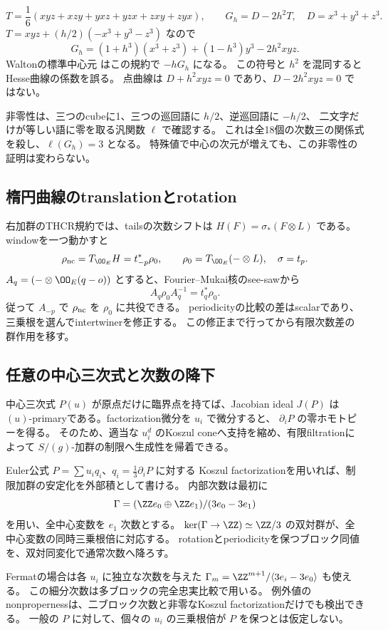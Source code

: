 \[
 T=\frac16(xyz+xzy+yxz+yzx+zxy+zyx),\qquad G_h=D-2h^2T,
 \quad D=x^3+y^3+z^3.
\]
\(T=xyz+(h/2)(-x^3+y^3-z^3)\) なので
\[
 G_h=(1+h^3)(x^3+z^3)+(1-h^3)y^3-2h^2xyz.
\]
Waltonの標準中心元 \cite[Equation (2.16)]{Walton} はこの規約で \(-hG_h\) になる。
この符号と \(h^2\) を混同するとHesse曲線の係数を誤る。
点曲線は \(D+h^2xyz=0\) であり、\(D-2h^2xyz=0\) ではない。

非零性は、三つのcubeに1、三つの巡回語に \(h/2\)、逆巡回語に \(-h/2\)、
二文字だけが等しい語に零を取る汎関数 \(\ell\) で確認する。
これは全18個の次数三の関係式を殺し、\(\ell(G_h)=3\) となる。
特殊値で中心の次元が増えても、この非零性の証明は変わらない。

\subsection{楕円曲線のtranslationとrotation}

右加群のTHCR規約では、tailsの次数シフトは
\(H(F)=\sigma_*(F\otimes L)\) である。
windowを一つ動かすと
\[
 \rho_{\rm nc}=T_{\OO_E}H=t_{-p}^*\rho_0,
 \qquad \rho_0=T_{\OO_E}(-\otimes L),\quad\sigma=t_p.
\]
\(A_q=(-\otimes\OO_E(q-o))\) とすると、Fourier--Mukai核のsee-sawから
\[
 A_q\rho_0A_q^{-1}=t_q^*\rho_0.
\]
従って \(A_{-p}\) で \(\rho_{\rm nc}\) を \(\rho_0\) に共役できる。
periodicityの比較の差はscalarであり、三乗根を選んでintertwinerを修正する。
この修正まで行ってから有限次数差の群作用を移す。

\subsection{任意の中心三次式と次数の降下}

中心三次式 \(P(u)\) が原点だけに臨界点を持てば、Jacobian ideal \(J(P)\) は
\((u)\)-primaryである。factorization微分を \(u_i\) で微分すると、
\(\partial_iP\) の零ホモトピーを得る。
そのため、適当な \(u_i^d\) のKoszul coneへ支持を縮め、有限filtrationによって
\(S/(g)\)-加群の制限へ生成性を帰着できる。

Euler公式 \(P=\sum u_iq_i\)、\(q_i=\frac13\partial_iP\) に対する
Koszul factorizationを用いれば、制限加群の安定化を外部積として書ける。
内部次数は最初に
\[
 \Gamma=(\ZZ e_0\oplus\ZZ e_1)/(3e_0-3e_1)
\]
を用い、全中心変数を \(e_1\) 次数とする。
\(\ker(\Gamma\to\ZZ)\simeq\ZZ/3\) の双対群が、全中心変数の同時三乗根倍に対応する。
rotationとperiodicityを保つブロック同値を、双対同変化で通常次数へ降ろす。

Fermatの場合は各 \(u_i\) に独立な次数を与えた
\(\Gamma_m=\ZZ^{m+1}/\langle3e_i-3e_0\rangle\) も使える。
この細分次数は多ブロックの完全忠実比較で用いる。
例外値のnonpropernessは、二ブロック次数と非零なKoszul factorizationだけでも検出できる。
一般の \(P\) に対して、個々の \(u_i\) の三乗根倍が \(P\) を保つとは仮定しない。

